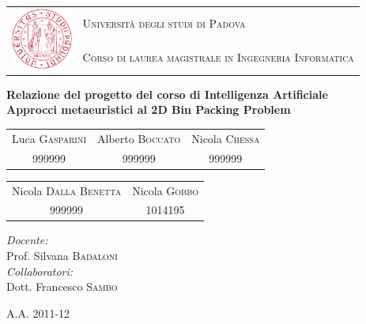 \thispagestyle{empty}
\begin{center}
	\leavevmode
	\large
	\begin{tabular}{ r l }
		\multirow{2}{*}{\includegraphics[width=2cm]{img/unipd_logo.png}} & \textsc{Università degli studi di Padova}\par \\
			& \textsc{Corso di laurea magistrale in Ingegneria Informatica} \\
	\end{tabular}
	\vskip 3cm
	
	\vfill
	\textbf{{\large Relazione del progetto del corso di Intelligenza Artificiale}}\\[0.2cm]
	\textbf{{\LARGE Approcci metaeuristici al 2D Bin Packing Problem}}\par
	\vskip 3cm
	\normalfont
	
	\begin{tabular}{ c c c }
		\large Luca \textsc{Gasparini} & Alberto \textsc{Boccato} &
				Nicola \textsc{Chessa} \\
		\normalsize 999999 & 999999 & 999999 \\
	\end{tabular}
	\vskip 0.5cm
	\begin{tabular}{ c c }
		\large Nicola \textsc{Dalla Benetta} & Nicola \textsc{Gobbo} \\
		\normalsize 999999 & 1014195 \\
	\end{tabular}
	\normalfont
	\vskip 4cm
	
	\begin{flushright}
		\emph{Docente:}\\
		Prof. Silvana \textsc{Badaloni}\\
	 \vskip 2cm
		\emph{Collaboratori:}\\
		Dott. Francesco \textsc{Sambo}\\
	\end{flushright}

	
	\vfill
	{\large A.A. 2011-12}
\end{center}
\cleardoublepage